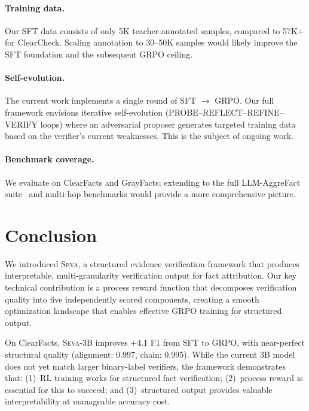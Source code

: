 \documentclass{article}
\newcommand{\seva}{\textsc{Seva}}
\begin{document}
\paragraph{Training data.}
Our SFT data consists of only 5K teacher-annotated samples, compared to 57K+ for ClearCheck.
Scaling annotation to 30--50K samples would likely improve the SFT foundation and the subsequent GRPO ceiling.

\paragraph{Self-evolution.}
The current work implements a single round of SFT $\to$ GRPO.
Our full framework envisions iterative self-evolution (PROBE--REFLECT--REFINE--VERIFY loops) where an adversarial proposer generates targeted training data based on the verifier's current weaknesses.
This is the subject of ongoing work.

\paragraph{Benchmark coverage.}
We evaluate on ClearFacts and GrayFacts; extending to the full LLM-AggreFact suite~\citep{tang2024llmaggrefact} and multi-hop benchmarks would provide a more comprehensive picture.


\section{Conclusion}
\label{sec:conclusion}

We introduced \seva{}, a structured evidence verification framework that produces interpretable, multi-granularity verification output for fact attribution.
Our key technical contribution is a process reward function that decomposes verification quality into five independently scored components, creating a smooth optimization landscape that enables effective GRPO training for structured output.

On ClearFacts, \seva{}-3B improves +4.1 F1 from SFT to GRPO, with near-perfect structural quality (alignment: 0.997, chain: 0.995).
While the current 3B model does not yet match larger binary-label verifiers, the framework demonstrates that: (1)~RL training works for structured fact verification; (2)~process reward is essential for this to succeed; and (3)~structured output provides valuable interpretability at manageable accuracy cost.
\end{document}
